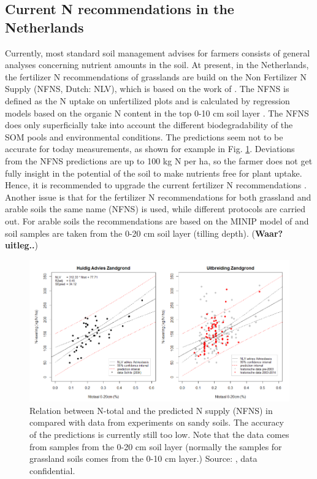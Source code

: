 \documentclass[10pt,twoside,dutch,english]{report}
\begin{document}
\subsection{Current N recommendations in the Netherlands} %
Currently, most standard soil management advises for farmers consists of general analyses concerning nutrient amounts in the soil. At present, in the Netherlands, the fertilizer N recommendations of grasslands are build on the Non Fertilizer N Supply (NFNS, Dutch: NLV), which is based on the work of \citet{Hassink1995a}. The NFNS is defined as the N uptake on unfertilized plots and is calculated by regression models based on the organic N content in the top 0-10 cm soil layer \citep{Bemestingscommissie2012}. The NFNS does only superficially take into account the different biodegradability of the SOM pools and environmental conditions. The predictions seem not to be accurate for today measurements, as shown for example in Fig. \ref{fig:intro_ros}. Deviations from the NFNS predictions are up to 100 kg N per ha, so the farmer does not get fully insight in the potential of the soil to make nutrients free for plant uptake. Hence, it is recommended to upgrade the current fertilizer N recommendations \citep{Hanegraaf2009, VanEekeren2010, Ros2015}. Another issue is that for the fertilizer N recommendations for both grassland and arable soils the same name (NFNS) is used, while different protocols are carried out. For arable soils the recommendations are based on the MINIP model of \citet{Janssen1984} and soil samples are taken from the 0-20 cm soil layer (tilling depth). (\textbf{Waar? uitleg..})\\

		\begin{figure}[t]
			\includegraphics[width=1\linewidth]{intro_ros}
			\caption{Relation between N-total and the predicted N supply (NFNS) in compared with data from experiments on sandy soils. The accuracy of the predictions is currently still too low. Note that the data comes from samples from the 0-20 cm soil layer (normally the samples for grassland soils comes from the 0-10 cm layer.) Source:   \citet{Ros2015}, data confidential.}
			\label{fig:intro_ros}
		\end{figure}
		
\end{document}
